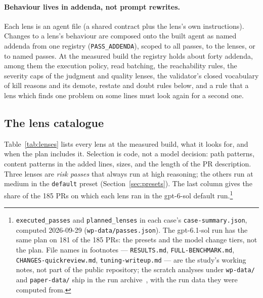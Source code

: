 \documentclass[11pt,a4paper]{article}
\newcommand{\code}[1]{\texttt{#1}}
\begin{document}
\paragraph{Behaviour lives in addenda, not prompt rewrites.} Each lens is an
agent file (a shared contract plus the lens's own instructions). Changes to
a lens's behaviour are composed onto the built agent as named addenda from
one registry (\code{PASS\_ADDENDA}), scoped to all passes, to the lenses, or
to named passes. At the measured build the registry holds about forty
addenda, among them the execution policy, read batching, the reachability
rules, the severity caps of the judgment and quality lenses, the validator's
closed vocabulary of kill reasons and its demote, restate and doubt rules
below, and a rule that a lens which finds one problem on some lines must
look again for a second one.

\subsection{The lens catalogue}
\label{sec:lenses}

Table~\ref{tab:lenses} lists every lens at the measured build, what it looks
for, and when the plan includes it. Selection is code, not a model
decision: path patterns, content patterns in the added lines, sizes, and the
length of the PR description. Three lenses are \emph{risk passes} that
always run at high reasoning; the others run at medium in the
\code{default} preset (Section~\ref{sec:presets}). The last column gives the
share of the 185 PRs on which each lens ran in the gpt-6-sol default
run.\footnote{\code{executed\_passes} and \code{planned\_lenses} in each
case's \code{case-summary.json}, computed 2026-09-29 (\code{wp-data/passes.json}).
The gpt-6.1-sol run has the same plan on 181 of the 185 PRs: the presets
and the model change tiers, not the plan. File names in footnotes ---
\code{RESULTS.md}, \code{FULL-BENCHMARK.md}, \code{CHANGES-quickreview.md},
\code{tuning-writeup.md} --- are the study's working notes, not part of the
public repository; the scratch analyses under \code{wp-data/} and
\code{paper-data/} ship in the run archive~\cite{qcrbench}, with the run data
they were computed from.}
\end{document}
